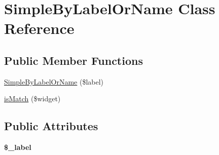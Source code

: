 \hypertarget{class_simple_by_label_or_name}{
\section{SimpleByLabelOrName Class Reference}
\label{class_simple_by_label_or_name}
}
\subsection*{Public Member Functions}
\begin{DoxyCompactItemize}
\item 
\hyperlink{class_simple_by_label_or_name_a3daeb4edee9e486f10ef238cbcf2b25e}{SimpleByLabelOrName} (\$label)
\item 
\hyperlink{class_simple_by_label_or_name_abaf2246caac29f2696e464443f91d9a5}{isMatch} (\$widget)
\end{DoxyCompactItemize}
\subsection*{Public Attributes}
\begin{DoxyCompactItemize}
\item 
\hypertarget{class_simple_by_label_or_name_ac3aee6f63f9ae0dd0348a3bd63d8425b}{
{\bfseries \$\_\-label}}
\label{class_simple_by_label_or_name_ac3aee6f63f9ae0dd0348a3bd63d8425b}

\end{DoxyCompactItemize}



